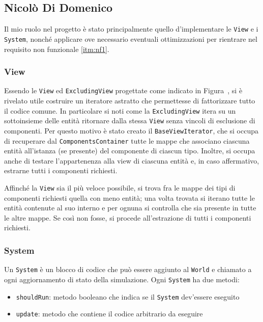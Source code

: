 \subsection{Nicolò Di Domenico}\label{subsec:nicolò-di-domenico}

Il mio ruolo nel progetto è stato principalmente quello d'implementare le \texttt{View} e i \texttt{System}, nonché
applicare ove necessario eventuali ottimizzazioni per rientrare nel requisito non funzionale \ref{itm:nf1}.

\subsubsection{View}

Essendo le \texttt{View} ed \texttt{ExcludingView} progettate come indicato in Figura~, si è rivelato utile costruire un
iteratore astratto che permettesse di fattorizzare tutto il codice comune.
In particolare si noti come la \texttt{ExcludingView} itera su un sottoinsieme delle entità ritornare dalla stessa
\texttt{View} senza vincoli di esclusione di componenti.
Per questo motivo è stato creato il \texttt{BaseViewIterator}, che si occupa di recuperare dal
\texttt{ComponentsContainer} tutte le mappe che associano ciascuna entità all'istanza (se presente) del componente di
ciascun tipo.
Inoltre, si occupa anche di testare l'appartenenza alla view di ciascuna entità e, in caso affermativo, estrarne tutti i
componenti richiesti.

Affinché la \texttt{View} sia il più veloce possibile, si trova fra le mappe dei tipi di componenti richiesti quella con
meno entità;
una volta trovata si iterano tutte le entità contenute al suo interno e per ognuna si controlla che sia presente in
tutte le altre mappe.
Se così non fosse, si procede all'estrazione di tutti i componenti richiesti.

\subsubsection{System}

Un \texttt{System} è un blocco di codice che può essere aggiunto al \texttt{World} e chiamato a ogni aggiornamento di
stato della simulazione.
Ogni \texttt{System} ha due metodi:
\begin{itemize}
    \item \texttt{shouldRun}: metodo booleano che indica se il \texttt{System} dev'essere eseguito
    \item \texttt{update}: metodo che contiene il codice arbitrario da eseguire
\end{itemize}

